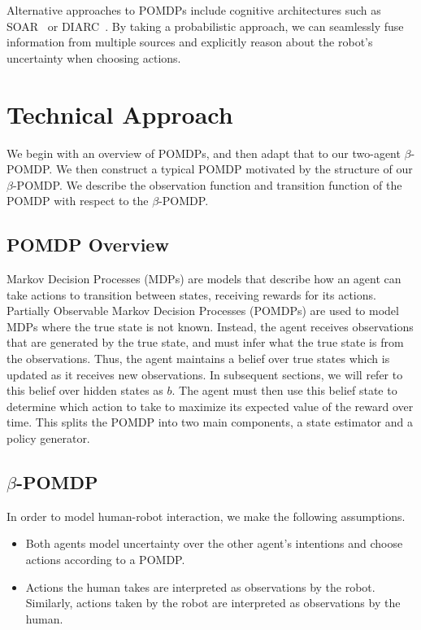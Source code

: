 \documentclass[conference]{IEEEtran}
\begin{document}
Alternative approaches to
POMDPs include cognitive architectures such as SOAR~\citep{soar} or
DIARC~\citep{diarc}.  By taking a probabilistic approach, we can seamlessly
fuse information from multiple sources and explicitly reason about the
robot's uncertainty when choosing actions.

\section{Technical Approach}

We begin with an overview of POMDPs, and then adapt that to our two-agent $\beta$-POMDP. We then construct a typical POMDP motivated by the structure of our $\beta$-POMDP. We describe the observation function and transition function of the POMDP with respect to the $\beta$-POMDP. 

\subsection{POMDP Overview}

Markov Decision Processes (MDPs)\cite{Bel} are models that describe how an agent can take actions to transition between states, receiving rewards for its actions. Partially Observable Markov Decision Processes (POMDPs) are used to model MDPs where the true state is not known. Instead, the agent receives observations that are generated by the true state, and must infer what the true state is from the observations. Thus, the agent maintains a belief over true states which is updated as it receives new observations. In subsequent sections, we will refer to this belief over hidden states as $b$. The agent must then use this belief state to determine which action to take to maximize its expected value of the reward over time. This splits the POMDP into two main components, a state estimator and a policy generator. 


\subsection{$\beta$-POMDP}

In order to model human-robot interaction, we make the following assumptions. 

\begin{itemize}
	\item Both agents model uncertainty over the other agent's intentions and choose actions according to a POMDP.
	\item Actions the human takes are interpreted as observations by the robot. Similarly, actions taken by the robot are interpreted as observations by the human. 
\end{itemize}
\end{document}
